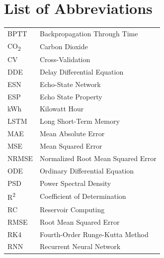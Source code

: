 \section*{List of Abbreviations}

\begin{tabular}{@{}ll@{}}
BPTT   & Backpropagation Through Time \\
CO\textsubscript{2} & Carbon Dioxide \\
CV     & Cross-Validation \\
DDE    & Delay Differential Equation \\
ESN    & Echo-State Network \\
ESP    & Echo State Property \\
kWh    & Kilowatt Hour \\
LSTM   & Long Short-Term Memory \\
MAE    & Mean Absolute Error \\
MSE    & Mean Squared Error \\
NRMSE  & Normalized Root Mean Squared Error \\
ODE    & Ordinary Differential Equation \\
PSD    & Power Spectral Density \\
R\textsuperscript{2} & Coefficient of Determination \\
RC     & Reservoir Computing \\
RMSE   & Root Mean Squared Error \\
RK4    & Fourth-Order Runge-Kutta Method \\
RNN    & Recurrent Neural Network \\
\end{tabular}
